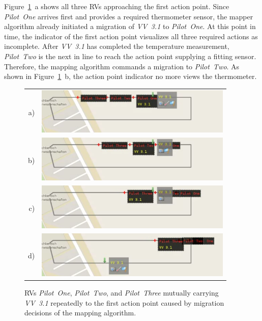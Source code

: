 Figure~\ref{fig:demo3mig03}~a shows all three \acp{RV} approaching the first action point. Since
\textit{Pilot~One} arrives first and provides a required thermometer sensor, the mapper algorithm already
initiated a migration of \textit{VV~3.1} to \textit{Pilot~One}. 
%
At this point in time, the indicator of the first action point visualizes all three required actions
as incomplete.
%
After \textit{VV~3.1} has completed the temperature measurement, \textit{Pilot~Two} is the next in line
to reach the action point supplying a fitting sensor. Therefore, the mapping algorithm commands a migration 
to \textit{Pilot~Two}.
%
As shown in Figure~\ref{fig:demo3mig03}~b, the action point indicator no more views
the thermometer.
\begin{figure}[h]
	\begin{center}
		\begin{tabular}{rr}
			a)&{\includegraphics[width=9.4cm]{ese-demo3-1.png}} \\
			b)&{\includegraphics[width=9.4cm]{ese-demo3-2.png}} \\
			c)&{\includegraphics[width=9.4cm]{ese-demo3-3.png}} \\
			d)&{\includegraphics[width=9.4cm]{ese-demo3-4.png}}
		\end{tabular}
	\end{center}
	\caption{\acp{RV} \textit{Pilot~One}, \textit{Pilot~Two}, and \textit{Pilot~Three} mutually carrying
	 	\textit{VV~3.1} repeatedly to the first action point caused by migration decisions of the mapping
	 algorithm.\label{fig:demo3mig03}}
\end{figure}


